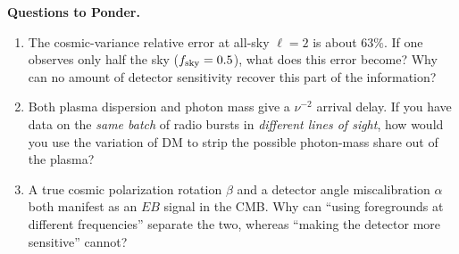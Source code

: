 \medskip
\noindent\textbf{Questions to Ponder.}
\begin{enumerate}
\item The cosmic-variance relative error at all-sky \(\ell=2\) is about \(63\%\). If one observes only half the sky (\(f_{\rm sky}=0.5\)), what does this error become? Why can no amount of detector sensitivity recover this part of the information?
\item Both plasma dispersion and photon mass give a \(\nu^{-2}\) arrival delay. If you have data on the \emph{same batch} of radio bursts in \emph{different lines of sight}, how would you use the variation of DM to strip the possible photon-mass share out of the plasma?
\item A true cosmic polarization rotation \(\beta\) and a detector angle miscalibration \(\alpha\) both manifest as an \(EB\) signal in the CMB. Why can ``using foregrounds at different frequencies'' separate the two, whereas ``making the detector more sensitive'' cannot?
\end{enumerate}
